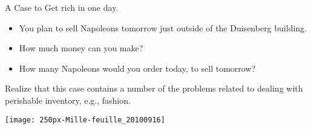 \begin{exercise} A Case to  Get rich in one day. 

  \begin{itemize}
  \item You plan to sell Napoleons tomorrow just outside of the
    Duisenberg building.
  \item How much money can you make? 
  \item How many Napoleons would you order today, to sell tomorrow?
  \end{itemize}
  Realize that this case contains a number of the problems related to
  dealing with perishable inventory, e.g., fashion. 

   \texttt{[image: 250px-Mille-feuille\_20100916]}

   \begin{comment}
Here are the steps.
  \begin{itemize}
  \item Let's first assume that demand is normally distributed. Then
    we know from FP that $Q$ should be such that
    $G(Q) = c_s/(c_s+c_o)$.
  \item We make some assumptions about the prices. Take $p_s=0.75$,
    $p_b = 0.25$. $p_e=0$. Hence, $c_o = 0.25$, and $c_s = 0.5$.
  \item Thus, the critical fraction is $c_s/(c_s+c_o)=0.5/0.75 = 2/3$.
  \item Now compute $z$ with $\Phi(z)=2/3.$. Hence $z=0.43$.
  \item We also need some idea about the demand. How to get this?
  \item For Napoleons, we don't have yesterday's demand \ldots
  \item Can we use demand data of similar products?  I don't know what
    data to use. I have never tried to sell napoleons.
  \item Can we ask our sales force?  no. We don't have a sales force. 
  \item Last resort: make an educated guess; use powers of ten
    trick. Under this price model, I expect to sell more 1 napoleon,
    also more than 10, 100 might be, 1000 is too much. So, take
    $\mu=100$ as an estimate. Since I am not sure, $\sigma=30$ seems
    reasonable.
  \item If $\mu = 100$ and $\sigma = 30$, then $Q=0.43\sigma + \mu \approx 112$.
  \item Finally, what is the profit $Z(Q)$?
\item With the above formulas you can compute $Z(Q)$,  but let's use handwaving for a quick estimate. 
\item Note that $\min\{Q, X\} \leq X$, hence
  $\E \min\{X, Q\} \leq \E X= \mu$. If $\E \min\{X, Q\}\approx 95$,
  then $Z(112) \approx 95p_s - 100 p_b = 95\cdot 0.75 - 100 \cdot 0.25$.
  Since $95\approx100$, use this to simplify yet more:
  $Z(112) \approx 100(0.75-0.25) = 50$ Euro.
\item There are easier ways to make money!
  \end{itemize}
\end{comment}
\end{exercise}

